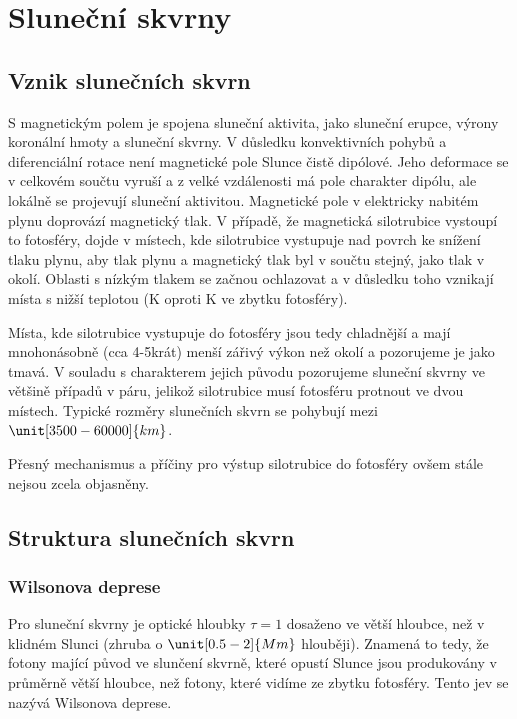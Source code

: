 \chapter{Sluneční skvrny}

\section{Vznik slunečních skvrn}
S magnetickým polem je spojena sluneční aktivita, jako sluneční erupce, výrony koronální hmoty a sluneční skvrny. V důsledku konvektivních pohybů a diferenciální rotace není magnetické pole Slunce čistě dipólové. Jeho deformace se v celkovém součtu vyruší a z velké vzdálenosti má pole charakter dipólu, ale lokálně se projevují sluneční aktivitou. Magnetické pole v elektricky nabitém plynu doprovází magnetický tlak. V případě, že magnetická silotrubice vystoupí to fotosféry, dojde v místech, kde silotrubice vystupuje nad povrch ke snížení tlaku plynu, aby tlak plynu a magnetický tlak byl v součtu stejný, jako tlak v okolí. Oblasti s nízkým tlakem se začnou ochlazovat a v důsledku toho vznikají místa s nižší teplotou (\unit[3000-4000]{K} oproti \unit[5000-6000]{K} ve zbytku fotosféry).

Místa, kde silotrubice vystupuje do fotosféry jsou tedy chladnější a mají mnohonásobně (cca 4-5krát) menší zářivý výkon než okolí a pozorujeme je jako tmavá. V souladu s charakterem jejich původu pozorujeme sluneční skvrny ve většině případů v páru, jelikož silotrubice musí fotosféru protnout ve dvou místech. Typické rozměry slunečních skvrn se pohybují mezi $\unit[3500-60000]{km}$.

Přesný mechanismus a příčiny pro výstup silotrubice do fotosféry ovšem stále nejsou zcela objasněny.


\section{Struktura slunečních skvrn}

\subsection{Wilsonova deprese}
Pro sluneční skvrny je optické hloubky $\tau=1$ dosaženo ve větší hloubce, než v klidném Slunci (zhruba o $\unit[0.5-2]{Mm}$ hlouběji). Znamená to tedy, že fotony mající původ ve slunčení skvrně, které opustí Slunce jsou produkovány v průměrně větší hloubce, než fotony, které vidíme ze zbytku fotosféry. Tento jev se nazývá Wilsonova deprese.

